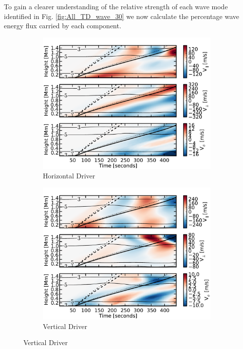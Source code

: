To gain a clearer understanding of the relative strength of each wave mode identified in Fig. \ref{fig:All_TD_wave_30} we now calculate the percentage wave energy flux carried by each component.

\begin{figure}
    \centering
    \begin{subfigure}[b]{0.49\textwidth}
        \includegraphics[width=\columnwidth]{Chapter4/Figs/TD_wave_speeds_horiz_p240_A10_r30.pdf}
        \caption{Horizontal Driver}
        \label{fig:All_TD_wave_30:horiz}
    \end{subfigure}
    \begin{subfigure}[b]{0.49\textwidth}
        \includegraphics[width=\columnwidth]{Chapter4/Figs/TD_wave_speeds_vert_p240_A10_r30.pdf}
        \caption{Vertical Driver}
        \label{fig:All_TD_wave_30:vert}
    \end{subfigure}
    

\end{figure}

